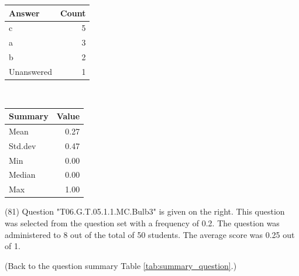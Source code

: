 \documentclass[12pt,english,nohyper]{tufte-handout}\usepackage[]{graphicx}\usepackage[]{color}
\begin{document}
\begin{center}%
\begin{tabular}{lr}
  \hline
Answer & Count \\ 
  \hline
c &   5 \\ 
  a &   3 \\ 
  b &   2 \\ 
  Unanswered &   1 \\ 
   \hline
\end{tabular}
~~~~~~~~%
\begin{tabular}{lr}
  \hline
Summary & Value \\ 
  \hline
Mean & 0.27 \\ 
  Std.dev & 0.47 \\ 
  Min & 0.00 \\ 
  Median & 0.00 \\ 
  Max & 1.00 \\ 
   \hline
\end{tabular}
\end{center}\newpage{} (81) Question "T06.G.T.05.1.1.MC.Bulb3" is given on the right. This question was selected from the question set with a frequency of 0.2. The question was administered to 8 out of the total of 50 students. The average score was 0.25 out of 1.

 (Back to the question summary Table \ref{tab:summary_question}.)
\end{document}
